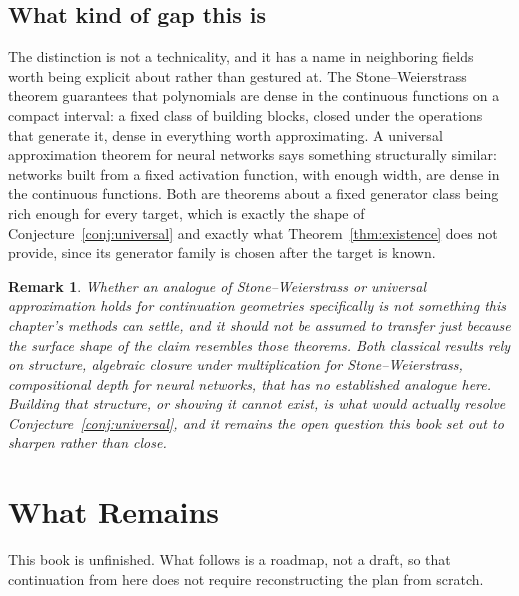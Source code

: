 \documentclass[11pt]{report}
\newtheorem{remark}{Remark}[chapter]
\begin{document}
\section*{What kind of gap this is}

The distinction is not a technicality, and it has a name in
neighboring fields worth being explicit about rather than gestured at.
The Stone--Weierstrass theorem guarantees that polynomials are dense
in the continuous functions on a compact interval: a fixed class of
building blocks, closed under the operations that generate it, dense
in everything worth approximating. A universal approximation theorem
for neural networks says something structurally similar: networks
built from a fixed activation function, with enough width, are dense
in the continuous functions. Both are theorems about a fixed generator
class being rich enough for every target, which is exactly the shape
of Conjecture~\ref{conj:universal} and exactly what
Theorem~\ref{thm:existence} does not provide, since its generator
family is chosen after the target is known.

\begin{remark}
Whether an analogue of Stone--Weierstrass or universal approximation
holds for continuation geometries specifically is not something this
chapter's methods can settle, and it should not be assumed to transfer
just because the surface shape of the claim resembles those theorems.
Both classical results rely on structure, algebraic closure under
multiplication for Stone--Weierstrass, compositional depth for neural
networks, that has no established analogue here. Building that
structure, or showing it cannot exist, is what would actually resolve
Conjecture~\ref{conj:universal}, and it remains the open question this
book set out to sharpen rather than close.
\end{remark}

\chapter*{What Remains}

This book is unfinished. What follows is a roadmap, not a draft, so
that continuation from here does not require reconstructing the plan
from scratch.
\end{document}
